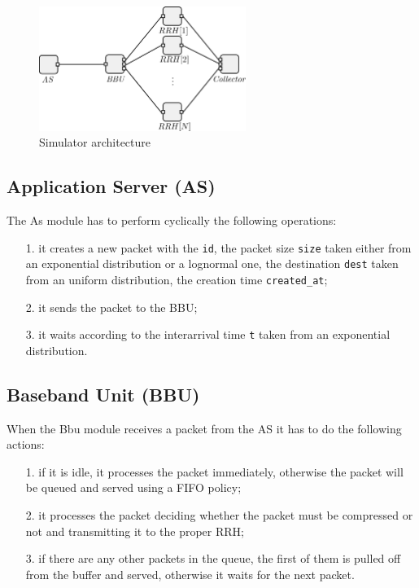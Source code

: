 \documentclass[11pt,a4paper,oneside, openright]{article}
\begin{document}
\begin{figure}[h]
    \centering
    \includegraphics[width=0.6\textwidth]{images/simulator}
    \caption{Simulator architecture}
    \label{fig:simulator}
\end{figure}

\subsection{Application Server (AS)}
The As module has to perform cyclically the following operations:
\begin{itemize}
    \item[1.] it creates a new packet with the \texttt{id}, the packet size \texttt{size} taken either from an exponential distribution or a lognormal one, the destination \texttt{dest} taken from an uniform distribution, the creation time \texttt{created\_at};
    \item[2.] it sends the packet to the BBU;
    \item[3.] it waits according to the interarrival time \texttt{t} taken from an exponential distribution.
\end{itemize}

\subsection{Baseband Unit (BBU)}
When the Bbu module receives a packet from the AS it has to do the following actions:
\begin{itemize}
    \item[1.] if it is idle, it processes the packet immediately, otherwise the packet will be queued and served using a FIFO policy;
    \item[2.] it processes the packet deciding whether the packet must be compressed or not and transmitting it to the proper RRH;
    \item[3.] if there are any other packets in the queue, the first of them is pulled off from the buffer and served, otherwise it waits for the next packet.
\end{itemize}
\end{document}
